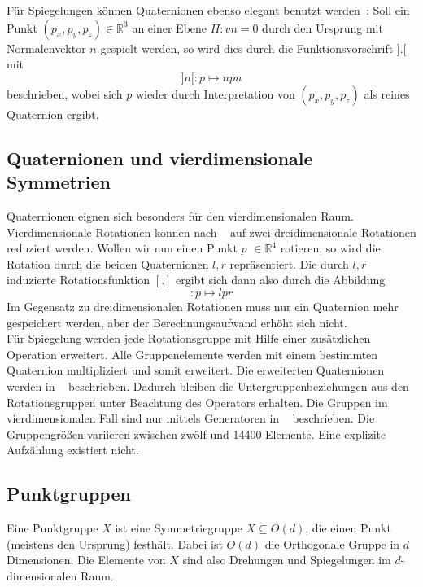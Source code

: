 \noindent Für Spiegelungen können Quaternionen ebenso elegant benutzt werden~\cite{1946}: Soll ein Punkt  $(p_x, p_y, p_z) \in \mathbb{R}^3$
an einer Ebene $\Pi: vn = 0$ durch den Ursprung mit Normalenvektor $n$ gespielt werden, so wird dies durch die Funktionsvorschrift $].[$ mit
\begin{equation*}
]n[: p \mapsto n p n
\end{equation*}
beschrieben, wobei sich $p$ wieder durch Interpretation von $(p_x, p_y, p_z)$ als reines Quaternion ergibt.

\subsection{Quaternionen und vierdimensionale Symmetrien}
Quaternionen eignen sich besonders für den vierdimensionalen Raum. Vierdimensionale Rotationen können nach ~\cite{conway2003} auf zwei dreidimensionale Rotationen reduziert werden.
\noindent Wollen wir nun einen Punkt $p$ $\in \mathbb{R}^4$ rotieren, so wird die Rotation durch die beiden Quaternionen $l,r$ repräsentiert.
Die durch $l,r$ induzierte Rotationsfunktion $[.]$ ergibt sich dann also durch die Abbildung
\begin{equation*}
[l,r]: p \mapsto l p r
\end{equation*}
Im Gegensatz zu dreidimensionalen Rotationen muss nur ein Quaternion mehr gespeichert werden,  aber der Berechnungsaufwand erhöht sich nicht.\\
Für Spiegelung werden jede Rotationsgruppe mit Hilfe einer zusätzlichen Operation erweitert. Alle Gruppenelemente werden mit einem bestimmten Quaternion multipliziert und somit erweitert. Die erweiterten Quaternionen werden in  ~\cite{conway2003} beschrieben. Dadurch bleiben die Untergruppenbeziehungen aus den Rotationsgruppen unter Beachtung des Operators erhalten.
Die Gruppen im vierdimensionalen Fall sind nur mittels Generatoren in ~\cite{conway2003} beschrieben. Die Gruppengrößen variieren zwischen zwölf und 14400 Elemente. Eine explizite Aufzählung existiert nicht. 

\subsection{Punktgruppen}
Eine Punktgruppe $X$ ist eine Symmetriegruppe $X \subseteq O(d)$, die einen Punkt (meistens den Ursprung) festhält.
Dabei ist $O(d)$ die Orthogonale Gruppe in $d$ Dimensionen. Die Elemente von $X$ sind also Drehungen und Spiegelungen im $d$-dimensionalen
Raum.

